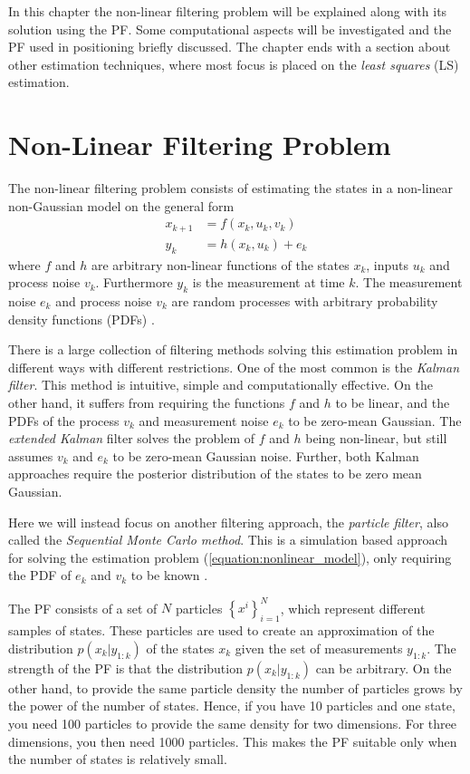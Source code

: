 \documentclass{LTHthesis}
\begin{document}
In this chapter the non-linear filtering problem will be explained along with its solution using the PF. Some computational aspects will be investigated and the PF used in positioning briefly discussed. The chapter ends with a section about other estimation techniques, where most focus is placed on the \emph{least squares} (LS) estimation.
%
\section{Non-Linear Filtering Problem}
\label{sec:nlfp}
The non-linear filtering problem consists of estimating the states in a non-linear non-Gaussian model on the general form
%
\begin{subequations}
\label{equation:nonlinear_model}
\begin{align}
x_{k+1} &= f(x_k,u_k,v_k) \label{equation:nonlinear_model_first}\\
y_k&=h(x_k,u_k) + e_k
\label{equation:nonlinear_model_second}
\end{align}
\end{subequations} 
%
where $f$ and $h$ are arbitrary non-linear functions of the states $x_k$, inputs $u_k$ and process noise $v_k$. Furthermore $y_k$ is the measurement at time $k$. The measurement noise $e_k$ and process noise $v_k$ are random processes with arbitrary probability density functions (PDFs) \cite{gson12}. 

There is a large collection of filtering methods solving this estimation problem in different ways with different restrictions. One of the most common is the \emph{Kalman filter}. This method is intuitive, simple and computationally effective. On the other hand, it suffers from requiring the functions $f$ and $h$ to be linear, and the PDFs of the process $v_k$ and measurement noise $e_k$ to be zero-mean Gaussian. The \emph{extended Kalman} filter solves the problem of $f$ and $h$ being non-linear, but still assumes $v_k$ and $e_k$ to be zero-mean Gaussian noise. Further, both Kalman approaches require the posterior distribution of the states to be zero mean Gaussian.

Here we will instead focus on another filtering approach, the \emph{particle filter}, also called the \emph{Sequential Monte Carlo method}. This is a simulation based approach for solving the estimation problem (\ref{equation:nonlinear_model}), only requiring the PDF of $e_k$ and $v_k$ to be known \cite{gson12,fig_fra10}.  

The PF consists of a set of $N$ particles $\left\{x^i\right\}_{i=1}^N$, which represent different samples of states. These particles are used to create an approximation of the distribution $p(x_k|y_{1:k})$  of the states $x_k$ given the set of measurements $y_{1:k}$. The strength of the PF is that the distribution $p(x_k|y_{1:k})$ can be arbitrary. On the other hand, to provide the same particle density the number of particles grows by the power of the number of states. Hence, if you have 10 particles and one state, you need 100 particles to provide the same density for two dimensions. For three dimensions, you then need 1000 particles. This makes the PF suitable only when the number of states is relatively small.
%
\end{document}
